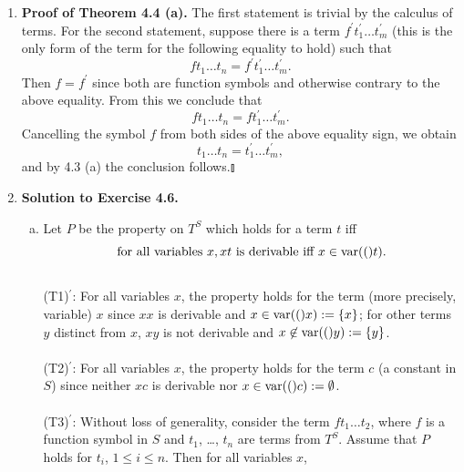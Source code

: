 \begin{enumerate}[1.]
\begin{enumerate}[(a)]
\ 
\\ $\varphi_1 = (\varphi \ast \psi)$ or $Q\varphi$, where $\ast = \land, \lor, \rightarrow, \leftrightarrow$, and $Q = \forall x, \exists x$: Similar to the above case. \\
\ 
\\From the argument above, we obtain
\[
\varphi_2 \ldots \varphi_n = \varphi_2^\prime \ldots \varphi_n^\prime.
\]
After repeatedly applying this argument the proof is complete.\nolinebreak\hfill$\talloblong$
\end{enumerate}
%
\item \textbf{Proof of Theorem 4.4 (a).} The first statement is trivial by the calculus of terms. For the second statement, suppose there is a term $f^\prime t_1^\prime \ldots t_m^\prime$ (this is the only form of the term for the following equality to hold) such that
\[
f t_1 \ldots t_n = f^\prime t_1^\prime \ldots t_m^\prime.
\]
Then $f = f^\prime$ since both are function symbols and otherwise contrary to the above equality. From this we conclude that
\[
f t_1 \ldots t_n = f t_1^\prime \ldots t_m^\prime.
\]
Cancelling the symbol $f$ from both sides of the above equality sign, we obtain
\[
t_1 \ldots t_n = t_1^\prime \ldots t_m^\prime ,
\]
and by 4.3 (a) the conclusion follows.\nolinebreak\hfill$\talloblong$
%
\item \textbf{Solution to Exercise 4.6.}
\begin{enumerate}[(a)]
\item Let $P$ be the property on $T^S$ which holds for a term $t$ iff
\[
\mbox{for all variables } x, xt \mbox{ is derivable iff } x \in {\mathrm{var}(()}t).
\]
\ 
\\
(T1)$^\prime$: For all variables $x$, the property holds for the term (more precisely, variable) $x$ since $xx$ is derivable and $x \in {\mathrm{var}(()}x):=\{x\}$; for other terms $y$ distinct from $x$, $xy$ is not derivable and $x \not \in {\mathrm{var}(()}y):=\{y\}$.\\
\\
(T2)$^\prime$: For all variables $x$, the property holds for the term $c$ (a constant in $S$) since neither $xc$ is derivable nor $x \in {\mathrm{var}(()}c):=\emptyset$.\\
\\
(T3)$^\prime$: Without loss of generality, consider the term $ft_1 \ldots t_2$, where $f$ is a function symbol in $S$ and $t_1$, \ldots, $t_n$ are terms from $T^S$. Assume that $P$ holds for $t_i$, $1 \leq i \leq n$. Then for all variables $x$, \\

\end{enumerate}
\end{enumerate}
